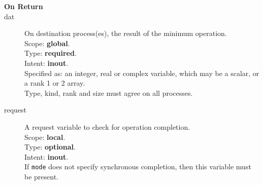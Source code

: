 \begin{description}
\item[\bf On Return]
\item[dat] On destination process(es), the result of the minimum operation.\\
Scope: {\bf global}.\\
Type: {\bf required}.\\
Intent: {\bf inout}.\\
Specified as: an integer, real or complex variable, which may be a
scalar, or a rank 1 or 2 array. \\
Type, kind, rank and size must agree on all processes.
\item[request] A request variable to check for operation completion.\\
Scope: {\bf local}.\\
Type: {\bf optional}.\\
Intent: {\bf inout}.\\
If \verb|mode| does not specify synchronous completion, then this
variable must be present.
\end{description}


